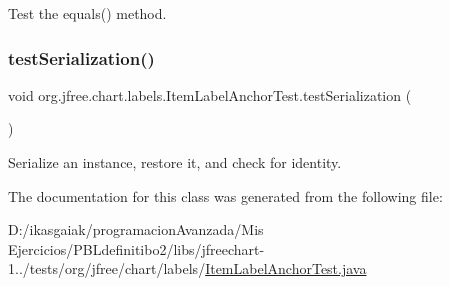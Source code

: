 Test the equals() method. \mbox{\label{classorg_1_1jfree_1_1chart_1_1labels_1_1_item_label_anchor_test_a9f9d6a896987a064dc2a0456fb8f4275}} 
\subsubsection{\texorpdfstring{test\+Serialization()}{testSerialization()}}
{\footnotesize\ttfamily void org.\+jfree.\+chart.\+labels.\+Item\+Label\+Anchor\+Test.\+test\+Serialization (\begin{DoxyParamCaption}{ }\end{DoxyParamCaption})}

Serialize an instance, restore it, and check for identity. 

The documentation for this class was generated from the following file\+:\begin{DoxyCompactItemize}
\item 
D\+:/ikasgaiak/programacion\+Avanzada/\+Mis Ejercicios/\+P\+B\+Ldefinitibo2/libs/jfreechart-\/1../tests/org/jfree/chart/labels/\mbox{\hyperlink{_item_label_anchor_test_8java}{Item\+Label\+Anchor\+Test.\+java}}\end{DoxyCompactItemize}
